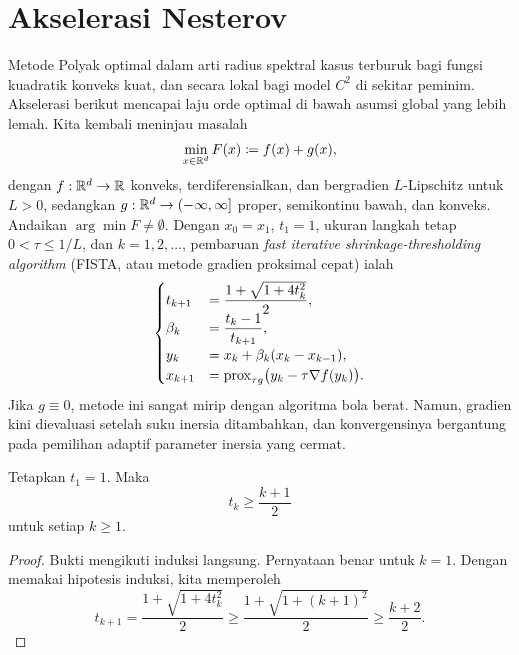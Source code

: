 \section{Akselerasi Nesterov}
Metode Polyak optimal dalam arti radius spektral kasus terburuk bagi fungsi kuadratik konveks kuat, dan secara lokal bagi model \(C^2\) di sekitar peminim. Akselerasi berikut mencapai laju orde optimal di bawah asumsi global yang lebih lemah. Kita kembali meninjau masalah
\begin{equation}
    \min_{x\in\mathbb{R}^d}F(x)\coloneqq f(x)+g(x),
\end{equation}
dengan \(f:\mathbb{R}^d\rightarrow\mathbb{R}\) konveks, terdiferensialkan, dan bergradien \(L\)-Lipschitz untuk \(L>0\), sedangkan \(g:\mathbb{R}^d\rightarrow(-\infty,\infty]\) proper, semikontinu bawah, dan konveks. Andaikan \(\arg\min F\neq\emptyset\). Dengan \(x_0=x_1\), \(t_1=1\), ukuran langkah tetap \(0<\tau\leq1/L\), dan \(k=1,2,\dots\), pembaruan \emph{fast iterative shrinkage-thresholding algorithm} (FISTA, atau metode gradien proksimal cepat) ialah
\begin{equation}
    \begin{cases}
        t_{k+1}&=\dfrac{1+\sqrt{1+4t_k^2}}{2},\\
        \beta_k&=\dfrac{t_k-1}{t_{k+1}},\\
        y_k&=x_k+\beta_k(x_k-x_{k-1}),\\
        x_{k+1}&=\mathrm{prox}_{\tau g}\bigl(y_k-\tau\nabla f(y_k)\bigr).
    \end{cases}
\end{equation}
Jika \(g\equiv0\), metode ini sangat mirip dengan algoritma bola berat. Namun, gradien kini dievaluasi setelah suku inersia ditambahkan, dan konvergensinya bergantung pada pemilihan adaptif parameter inersia yang cermat.

\begin{lemma}
    Tetapkan \(t_1=1\). Maka
    \begin{equation}
        t_k\geq\frac{k+1}{2}
    \end{equation}
    untuk setiap \(k\geq1\).
\end{lemma}
\begin{proof}
    Bukti mengikuti induksi langsung. Pernyataan benar untuk \(k=1\). Dengan memakai hipotesis induksi, kita memperoleh
    \begin{equation}
        t_{k+1}
        =\frac{1+\sqrt{1+4t_k^2}}{2}
        \geq\frac{1+\sqrt{1+(k+1)^2}}{2}
        \geq\frac{k+2}{2}.
    \end{equation}
\end{proof}

